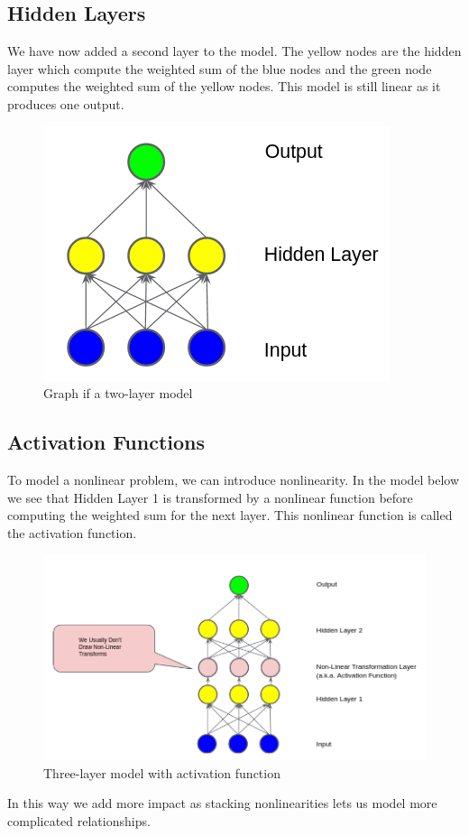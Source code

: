 \documentclass[12pt]{article}
\begin{document}
\subsection{Hidden Layers}
We have now added a second layer to the model. The yellow nodes are the hidden layer which compute the weighted sum of the blue nodes and the green node computes the weighted sum of the yellow nodes. This model is still linear as it produces one output.
\begin{figure}[H]
	\includegraphics[scale = 0.5]{imgs/TwoLayerGraph.png}
	\centering
	\caption{Graph if a two-layer model}
\end{figure}
\subsection{Activation Functions}
To model a nonlinear problem, we can introduce nonlinearity. In the model below we see that Hidden Layer 1 is transformed by a nonlinear function before computing the weighted sum for the next layer. This nonlinear function is called the activation function.
\begin{figure}[H]
	\includegraphics[scale = 0.5]{imgs/activationLayer.png}
	\centering
	\caption{Three-layer model with activation function}
\end{figure}
In this way we add more impact as stacking nonlinearities lets us model more complicated relationships.
\end{document}
